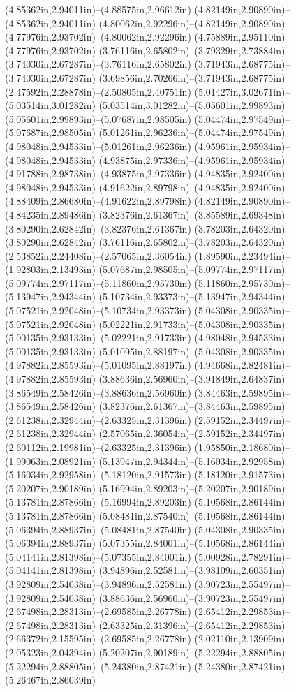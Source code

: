 (4.85362in,2.94011in)--(4.88575in,2.96612in) (4.82149in,2.90890in)--(4.85362in,2.94011in) (4.80062in,2.92296in)--(4.82149in,2.90890in) (4.77976in,2.93702in)--(4.80062in,2.92296in) (4.75889in,2.95110in)--(4.77976in,2.93702in) (3.76116in,2.65802in)--(3.79329in,2.73884in) (3.74030in,2.67287in)--(3.76116in,2.65802in) (3.71943in,2.68775in)--(3.74030in,2.67287in) (3.69856in,2.70266in)--(3.71943in,2.68775in) (2.47592in,2.28878in)--(2.50805in,2.40751in) (5.01427in,3.02671in)--(5.03514in,3.01282in) (5.03514in,3.01282in)--(5.05601in,2.99893in) (5.05601in,2.99893in)--(5.07687in,2.98505in) (5.04474in,2.97549in)--(5.07687in,2.98505in) (5.01261in,2.96236in)--(5.04474in,2.97549in) (4.98048in,2.94533in)--(5.01261in,2.96236in) (4.95961in,2.95934in)--(4.98048in,2.94533in) (4.93875in,2.97336in)--(4.95961in,2.95934in) (4.91788in,2.98738in)--(4.93875in,2.97336in) (4.94835in,2.92400in)--(4.98048in,2.94533in) (4.91622in,2.89798in)--(4.94835in,2.92400in) (4.88409in,2.86680in)--(4.91622in,2.89798in) (4.82149in,2.90890in)--(4.84235in,2.89486in) (3.82376in,2.61367in)--(3.85589in,2.69348in) (3.80290in,2.62842in)--(3.82376in,2.61367in) (3.78203in,2.64320in)--(3.80290in,2.62842in) (3.76116in,2.65802in)--(3.78203in,2.64320in) (2.53852in,2.24408in)--(2.57065in,2.36054in) (1.89590in,2.23494in)--(1.92803in,2.13493in) (5.07687in,2.98505in)--(5.09774in,2.97117in) (5.09774in,2.97117in)--(5.11860in,2.95730in) (5.11860in,2.95730in)--(5.13947in,2.94344in) (5.10734in,2.93373in)--(5.13947in,2.94344in) (5.07521in,2.92048in)--(5.10734in,2.93373in) (5.04308in,2.90335in)--(5.07521in,2.92048in) (5.02221in,2.91733in)--(5.04308in,2.90335in) (5.00135in,2.93133in)--(5.02221in,2.91733in) (4.98048in,2.94533in)--(5.00135in,2.93133in) (5.01095in,2.88197in)--(5.04308in,2.90335in) (4.97882in,2.85593in)--(5.01095in,2.88197in) (4.94668in,2.82481in)--(4.97882in,2.85593in) (3.88636in,2.56960in)--(3.91849in,2.64837in) (3.86549in,2.58426in)--(3.88636in,2.56960in) (3.84463in,2.59895in)--(3.86549in,2.58426in) (3.82376in,2.61367in)--(3.84463in,2.59895in) (2.61238in,2.32944in)--(2.63325in,2.31396in) (2.59152in,2.34497in)--(2.61238in,2.32944in) (2.57065in,2.36054in)--(2.59152in,2.34497in) (2.60112in,2.19981in)--(2.63325in,2.31396in) (1.95850in,2.18680in)--(1.99063in,2.08921in) (5.13947in,2.94344in)--(5.16034in,2.92958in) (5.16034in,2.92958in)--(5.18120in,2.91573in) (5.18120in,2.91573in)--(5.20207in,2.90189in) (5.16994in,2.89203in)--(5.20207in,2.90189in) (5.13781in,2.87866in)--(5.16994in,2.89203in) (5.10568in,2.86144in)--(5.13781in,2.87866in) (5.08481in,2.87540in)--(5.10568in,2.86144in) (5.06394in,2.88937in)--(5.08481in,2.87540in) (5.04308in,2.90335in)--(5.06394in,2.88937in) (5.07355in,2.84001in)--(5.10568in,2.86144in) (5.04141in,2.81398in)--(5.07355in,2.84001in) (5.00928in,2.78291in)--(5.04141in,2.81398in) (3.94896in,2.52581in)--(3.98109in,2.60351in) (3.92809in,2.54038in)--(3.94896in,2.52581in) (3.90723in,2.55497in)--(3.92809in,2.54038in) (3.88636in,2.56960in)--(3.90723in,2.55497in) (2.67498in,2.28313in)--(2.69585in,2.26778in) (2.65412in,2.29853in)--(2.67498in,2.28313in) (2.63325in,2.31396in)--(2.65412in,2.29853in) (2.66372in,2.15595in)--(2.69585in,2.26778in) (2.02110in,2.13909in)--(2.05323in,2.04394in) (5.20207in,2.90189in)--(5.22294in,2.88805in) (5.22294in,2.88805in)--(5.24380in,2.87421in) (5.24380in,2.87421in)--(5.26467in,2.86039in) 